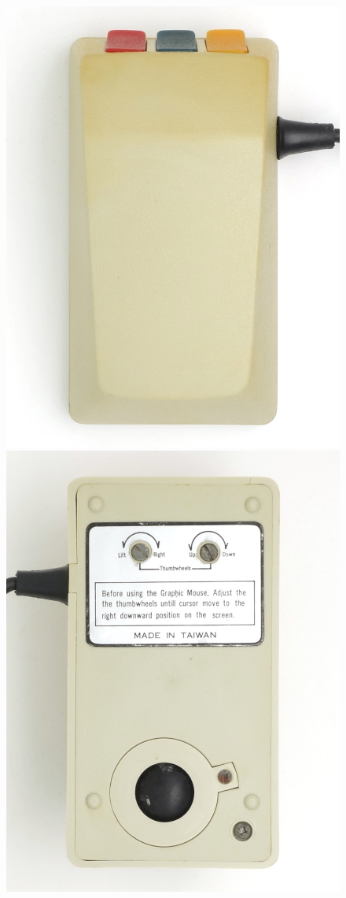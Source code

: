 \documentclass[11pt, a4paper]{article}
\begin{document}
\begin{figure}[h]
    \centering
    \includegraphics[scale=0.77]{1985_smc_contriver_magic_mouse/top_30.jpg}
    \includegraphics[scale=0.77]{1985_smc_contriver_magic_mouse/bottom_30.jpg}

\end{figure}
\end{document}
